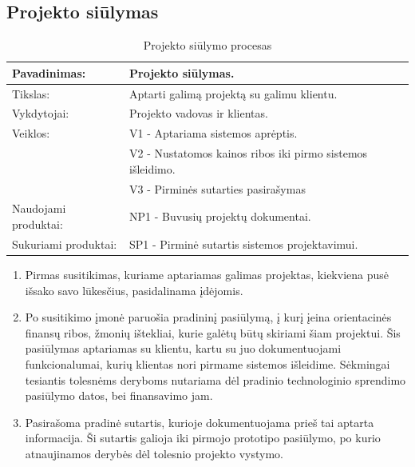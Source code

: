 \documentclass{VUMIFPSkursinis}
\begin{document}
	\subsection{Projekto siūlymas}

	\begin{center}
		\begin{table}[ht]
			\caption{Projekto siūlymo procesas}
		\begin{tabular}{ | l | l | } 
		\hline
	Pavadinimas:         & Projekto siūlymas.                                      \\ \hline
	Tikslas: 	           & Aptarti galimą projektą su galimu klientu. 							\\ \hline
	Vykdytojai:          & Projekto vadovas ir klientas.                             \\ \hline
	Veiklos:             & V1 - Aptariama sistemos aprėptis. 													\\
											 & V2 - Nustatomos kainos ribos iki pirmo sistemos išleidimo.  \\
											 & V3 - Pirminės sutarties pasirašymas 													\\ \hline
	Naudojami produktai: & NP1 - Buvusių projektų dokumentai. 													 \\ \hline
	Sukuriami produktai: & SP1 - Pirminė sutartis sistemos projektavimui. 								\\ \hline
\end{tabular}
\end{table}
\end{center}
\begin{enumerate}
	\item Pirmas susitikimas, kuriame aptariamas galimas projektas, kiekviena pusė išsako savo lūkesčius, pasidalinama įdėjomis.
	\item Po susitikimo įmonė paruošia pradininį pasiūlymą, į kurį įeina orientacinės finansų ribos, žmonių ištekliai, kurie galėtų būtų skiriami šiam projektui. Šis pasiūlymas aptariamas su klientu, kartu su juo dokumentuojami funkcionalumai, kurių klientas nori pirmame sistemos išleidime. Sėkmingai tesiantis tolesnėms deryboms nutariama dėl pradinio technologinio sprendimo pasiūlymo datos, bei finansavimo jam.
	\item Pasirašoma pradinė sutartis, kurioje dokumentuojama prieš tai aptarta informacija. Ši sutartis galioja iki pirmojo prototipo pasiūlymo, po kurio atnaujinamos derybės dėl tolesnio projekto vystymo.
\end{enumerate}
\end{document}
